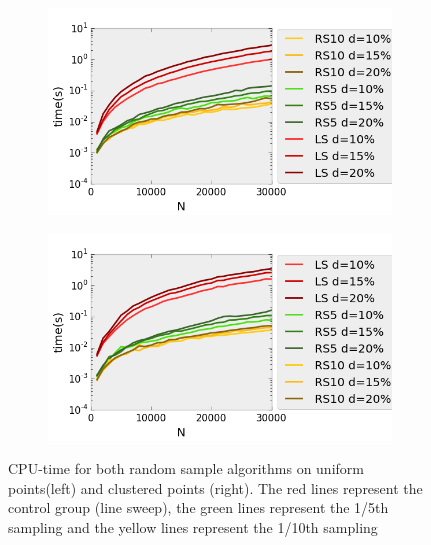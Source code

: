\begin{figure}[H] 
  \begin{subfigure}[b]{0.5\linewidth}
    \centering
    \includegraphics[width=0.9\linewidth]{Pictures/unif_ls_rs_t} 
    \label{fig:unif_ls_rs_t} 
    \vspace{4ex}
  \end{subfigure}%
  \begin{subfigure}[b]{0.5\linewidth}
    \centering
    \includegraphics[width=0.9\linewidth]{Pictures/clus_ls_rs_t} 
    \label{fig:clus_ls_rs_t} 
    \vspace{4ex}
  \end{subfigure}
  \caption[CPU-time for both random sample algorithms]{CPU-time for both random sample algorithms on uniform points(left) and clustered points (right). The red lines represent the control group (line sweep), the green lines represent the 1/5th sampling and the yellow lines represent the 1/10th sampling}
  \label{fig:ls_rs_t} 
\end{figure}

